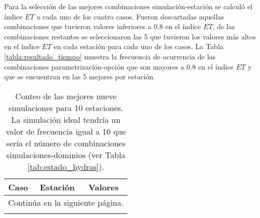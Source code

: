 Para la selección de las mejores combinaciones simulación-estación se calculó el índice $ET$ a cada uno de los cuatro casos. Fueron descartadas aquellas combinaciones que tuvieron valores inferiores a 0.8 en el índice $ET$, de las combinaciones restantes se seleccionaron las 5 que tuvieron los valores más altos en el índice $ET$ en cada estación para cada uno de los casos. La Tabla \ref{tabla:resultado_tiempo} muestra la frecuencia de ocurrencia de las combinaciones parametrización-opción que son mayores a 0.8 en el índice $ET$ y que se encuentran en las 5 mejores por estación.\\


\begin{longtable}{lll}

\caption{Conteo de las mejores nueve simulaciones para 10 estaciones. La simulación ideal tendría un valor de frecuencia igual a 10 que sería el número de combinaciones simulaciones-dominios (ver Tabla \ref{tab:estado_hydras}).}
\label{tab_estaciones_5_tiempo}\\
\hline
Caso & Estación & Valores \\

\midrule
\endhead
\midrule
\multicolumn{3}{r}{{Continúa en la siguiente página.}} \\
\midrule
\endfoot

\bottomrule
\endlastfoot



\end{longtable}
